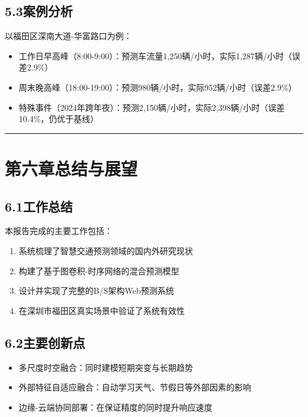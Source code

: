 \documentclass{harryopo-report}
\begin{document}
\section*{5.3案例分析}

以福田区深南大道-华富路口为例：

\begin{itemize}
  \item {\fzht 工作日早高峰}（8:00-9:00）：预测车流量1,250辆/小时，实际1,287辆/小时（误差2.9\%）
  \item {\fzht 周末晚高峰}（18:00-19:00）：预测980辆/小时，实际952辆/小时（误差2.9\%）
  \item {\fzht 特殊事件}（2024年跨年夜）：预测2,150辆/小时，实际2,398辆/小时（误差10.4\%，仍优于基线）
\end{itemize}

\medskip\hrule\medskip

\chapter*{第六章总结与展望}

\section*{6.1工作总结}

本报告完成的主要工作包括：

\begin{enumerate}
  \item 系统梳理了智慧交通预测领域的国内外研究现状
  \item 构建了基于图卷积-时序网络的混合预测模型
  \item 设计并实现了完整的B/S架构Web预测系统
  \item 在深圳市福田区真实场景中验证了系统有效性
\end{enumerate}

\section*{6.2主要创新点}

\begin{itemize}
  \item {\fzht 多尺度时空融合}：同时建模短期突变与长期趋势
  \item {\fzht 外部特征自适应融合}：自动学习天气、节假日等外部因素的影响
  \item {\fzht 边缘-云端协同部署}：在保证精度的同时提升响应速度
\end{itemize}
\end{document}
